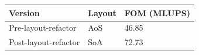 \begin{tabular}{@{}lll@{}}
\toprule
Version & Layout & FOM (MLUPS) \\
\midrule
Pre-layout-refactor & AoS & 46.85 \\
Post-layout-refactor & SoA & 72.73 \\
\bottomrule
\end{tabular}
